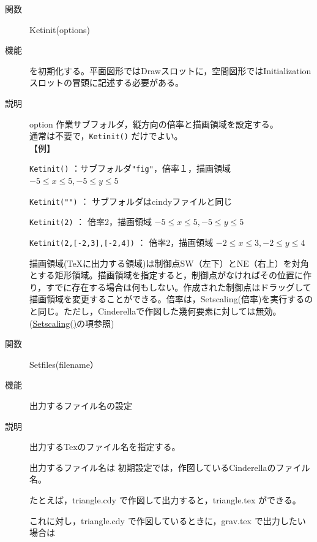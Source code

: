 \documentclass[papersize,a4paper,12pt,uplatex]{jsarticle}
\begin{document}
\begin{description}

\vspace{\baselineskip}
\hypertarget{ketinit}{}
\item[関数]  Ketinit(options)
\item[機能]  \ketcindy を初期化する。平面図形ではDrawスロットに，空間図形ではInitialization スロットの冒頭に記述する必要がある。
\item[説明]  option 作業サブフォルダ，縦方向の倍率と描画領域を設定する。\\
\phantom{option }通常は不要で，\verb|Ketinit()| だけでよい。\\

【例】

\verb|Ketinit()|   ：サブフォルダ\verb|"fig"|，倍率１，描画領域 $-5 \leq x \leq 5 , -5 \leq y \leq 5$

\verb|Ketinit("")| ： サブフォルダはcindyファイルと同じ

\verb|Ketinit(2)| ： 倍率2，描画領域 $-5 \leq x \leq 5 , -5 \leq y \leq 5$

\verb|Ketinit(2,[-2,3],[-2,4])| ： 倍率2，描画領域 $-2 \leq x \leq 3 , -2 \leq y \leq 4$

\vspace{\baselineskip}
描画領域(TeXに出力する領域)は制御点SW（左下）とNE（右上）を対角とする矩形領域。描画領域を指定すると，制御点がなければその位置に作り，すでに存在する場合は何もしない。作成された制御点はドラッグして描画領域を変更することができる。倍率は，Setscaling(倍率)を実行するのと同じ。ただし，Cinderellaで作図した幾何要素に対しては無効。(\hyperlink{setscaling}{Setscaling()}の項参照)


\vspace{\baselineskip}
\hypertarget{setfiles}{}
\item[関数]  Setfiles(filename）
\item[機能]  出力するファイル名の設定
\item[説明]  出力するTexのファイル名を指定する。

出力するファイル名は 初期設定では，作図しているCinderellaのファイル名。

たとえば，triangle.cdy で作図して出力すると，triangle.tex ができる。

これに対し，triangle.cdy で作図しているときに，grav.tex で出力したい場合は


\end{description}
\end{document}
